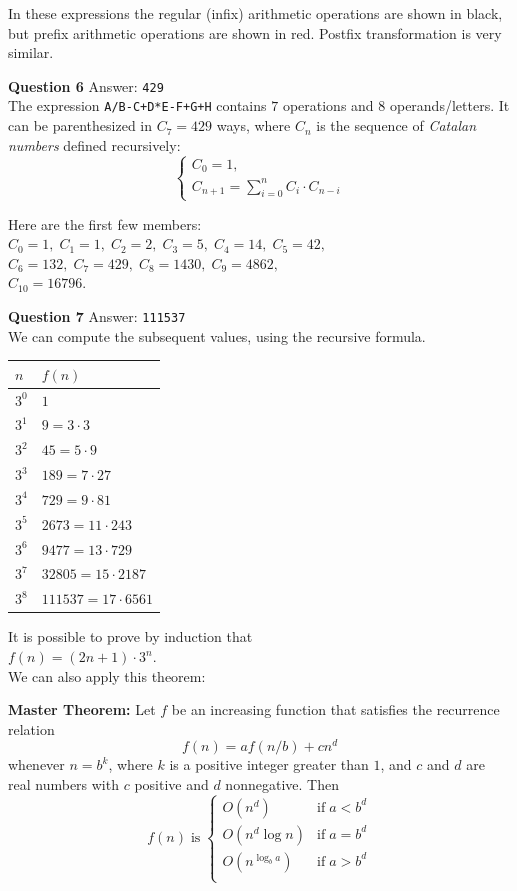 \documentclass[jou]{apa6}
\begin{document}
In these expressions the regular (infix) arithmetic operations are shown in black, but 
prefix arithmetic operations are shown in red. Postfix transformation is very similar.



\vspace{6pt}
{\bf Question 6} Answer: {\tt 429}\\ 
The expression {\tt A/B-C+D*E-F+G+H} contains
$7$ operations and $8$ operands/letters. It can 
be parenthesized in $C_7 = 429$ ways, where
$C_n$ is the sequence of {\em Catalan numbers}
defined recursively: 
$$\left\{ \begin{array}{l}
C_0 = 1, \\
C_{n+1}=\sum\limits_{i=0}^{n} C_i \cdot C_{n-i} 
\end{array} \right.$$

Here are the first few members:\\
$C_0=1,\; C_1=1,\; C_2=2,\; C_3=5,\; C_4=14,\; C_5=42,$\\
$C_6=132,\; C_7=429,\; C_8=1430,\; C_9=4862,$\\
$C_{10}=16796.$


\vspace{6pt}
{\bf Question 7} Answer: {\tt 111537}\\
We can compute the subsequent values, using the recursive formula.

\begin{tabular}{|l|l|} \hline
$n$ & $f(n)$ \\ \hline
$3^0$ & $1$ \\ \hline
$3^1$ & $9 = 3 \cdot 3$ \\ \hline
$3^2$ & $45 = 5 \cdot 9$ \\ \hline
$3^3$ & $189 = 7 \cdot 27$ \\ \hline
$3^4$ & $729 = 9 \cdot 81$ \\ \hline
$3^5$ & $2673 = 11 \cdot 243$ \\ \hline
$3^6$ & $9477 = 13 \cdot 729$ \\ \hline
$3^7$ & $32805 = 15 \cdot 2187$ \\ \hline
$3^8$ & $111537 = 17 \cdot 6561$ \\ \hline
\end{tabular}

It is possible to prove by induction that\\ $f(n) = (2n+1) \cdot 3^n$.\\
We can also apply this theorem:

{\bf Master Theorem:} Let $f$ be an increasing function that 
satisfies the recurrence relation
$$f(n) = af(n/b) + cn^d$$
whenever $n = b^k$, where $k$ is a positive integer greater than 
$1$, and $c$  and $d$ are real numbers with $c$ positive 
and $d$ nonnegative. Then
$$f(n)\;\text{is}\;\left\{ \begin{array}{ll}
O\left(n^d\right) & \text{if}\;a<b^d \\
O\left(n^d \log n \right) & \text{if}\;a=b^d \\
O\left(n^{\log_b a}\right) & \text{if}\;a>b^d \\
\end{array} \right.$$
\end{document}
